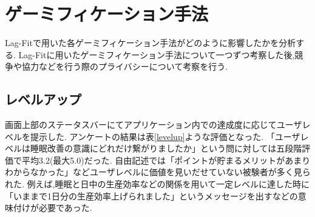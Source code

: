 \section{ゲーミフィケーション手法}
Lag-Fitで用いた各ゲーミフィケーション手法がどのように影響したかを分析する.
Lag-Fitに用いたゲーミフィケーション手法について一つずつ考察した後,競争や協力などを行う際のプライバシーについて考察を行う.
\subsection{レベルアップ}
画面上部のステータスバーにてアプリケーション内での達成度に応じてユーザレベルを提示した.
アンケートの結果は表\ref{levelup}ような評価となった.
「ユーザレベルは睡眠改善の意識にどれだけ繋がりましたか」という問に対しては五段階評価で平均3.2(最大5.0)だった.
自由記述では「ポイントが貯まるメリットがあまりわからなかった」などユーザレベルに価値を見いだせていない被験者が多く見られた.
例えば,睡眠と日中の生産効率などの関係を用いて一定レベルに達した時に「いままで1日分の生産効率上げられました」というメッセージを出すなどの意味付けが必要であった.
\begin{table}[htbp]
	\begin{center}
 	\end{center}
 	\caption{最終アンケート:レベルアップについて}
 	\label{levelup}
\end{table}

